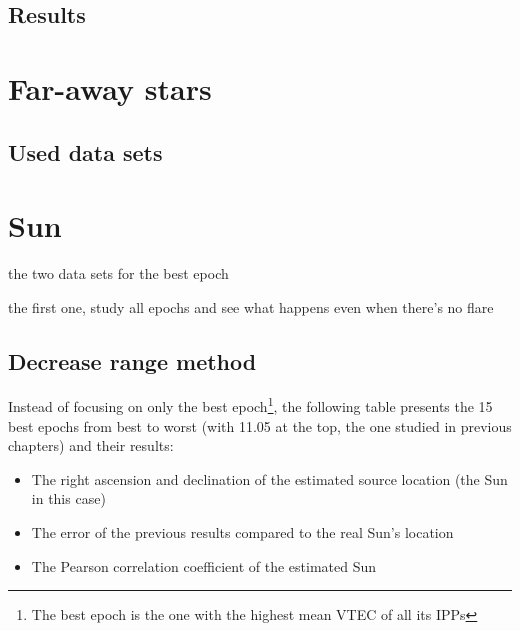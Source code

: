 \subsection{Results}




\section{Far-away stars}

\subsection{Used data sets}








\clearpage
\clearpage

\section{Sun}

the two data sets for the best epoch

the first one, study all epochs and see what happens even when there's no flare

\subsection{Decrease range method}

Instead of focusing on only the best epoch\footnote{The best epoch is the one with the highest mean VTEC of all its IPPs}, the following table presents the 15 best epochs from best to worst (with 11.05 at the top, the one studied in previous chapters) and their results: 

\begin{itemize}
	\item The right ascension and declination of the estimated source location (the Sun in this case)
	\item The error of the previous results compared to the real Sun's location
	\item The Pearson correlation coefficient of the estimated Sun
\end{itemize}

